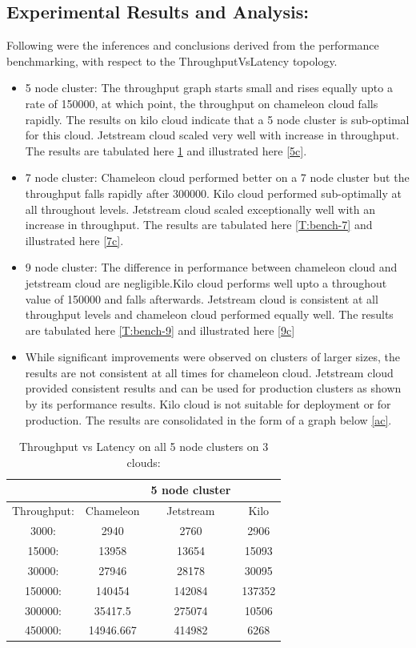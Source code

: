 \documentclass[9pt,twocolumn,twoside]{../../styles/osajnl}
\begin{document}
\subsection{Experimental Results and Analysis:}
Following were the inferences and conclusions derived from the performance
benchmarking, with respect to the ThroughputVsLatency topology.
\begin{itemize}
\item 5 node cluster: The throughput graph starts small and rises equally upto a 
rate of 150000, at which point, the throughput on chameleon cloud falls rapidly. 
The results on kilo cloud indicate that a 5 node cluster is sub-optimal for this 
cloud. Jetstream cloud scaled very well with increase in throughput. The results 
are tabulated here \ref{T:bench-5} and illustrated here \ref{5c}.
\item 7 node cluster: Chameleon cloud performed better on a 7 node cluster but 
the throughput falls rapidly after 300000. Kilo cloud performed sub-optimally at 
all throughout levels. Jetstream cloud scaled exceptionally well with an increase 
in throughput. The results are tabulated here \ref{T:bench-7} and illustrated 
here \ref{7c}.
\item 9 node cluster: The difference in performance between chameleon cloud and 
jetstream cloud are negligible.Kilo cloud performs well upto a throughout value 
of 150000 and falls afterwards. Jetstream cloud is consistent at all throughput 
levels and chameleon cloud performed equally well. The results are tabulated here 
\ref{T:bench-9} and illustrated here \ref{9c}
\item While significant improvements were observed on clusters of larger sizes, 
the results are not consistent at all times for chameleon cloud. Jetstream cloud 
provided consistent results and can be used for production clusters as shown by 
its performance results. Kilo cloud is not suitable for deployment or for 
production. The results are consolidated in the form of a graph below \ref{ac}.
\end{itemize}

\begin{table}[!htb]
\centering
\caption{Throughput vs Latency on all 5 node clusters on 3 clouds:}\label{T:bench-5}
\begin{center}
 \begin{tabular}{|c|| c c c|} 
 \hline
  &   &5 node cluster & \\ [0.5ex]
 \hline\hline
 Throughput: & Chameleon & Jetstream & Kilo \\ 
 \hline
 3000: & 2940 & 2760 & 2906 \\
 \hline
 15000: & 13958 & 13654 & 15093 \\
 \hline
 30000: & 27946 & 28178 & 30095 \\
 \hline
 150000: & 140454& 142084 &137352 \\
 \hline
 300000: & 35417.5 & 275074 & 10506 \\
 \hline
 450000: & 14946.667 & 414982 & 6268 \\
 \hline
\end{tabular}
\end{center}
\end{table}
\end{document}
